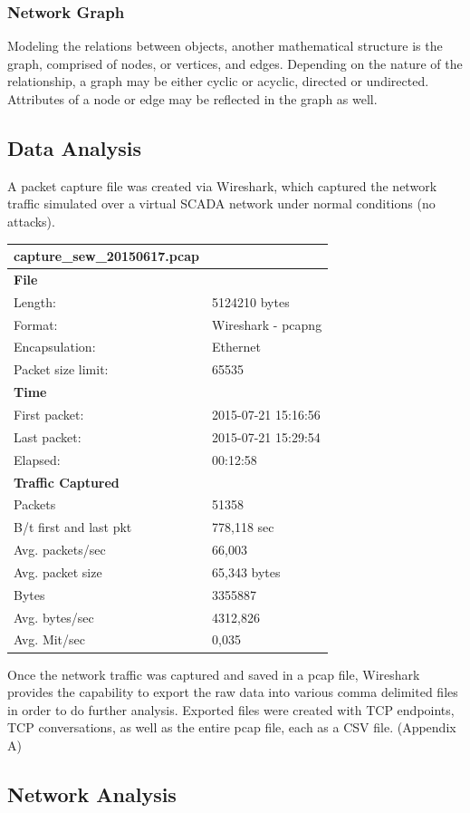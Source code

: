 \documentclass[12pt,]{article}
\begin{document}
\subsubsection{Network Graph}\label{network-graph}

Modeling the relations between objects, another mathematical structure
is the graph, comprised of nodes, or vertices, and edges. Depending on
the nature of the relationship, a graph may be either cyclic or acyclic,
directed or undirected. Attributes of a node or edge may be reflected in
the graph as well.

\subsection{Data Analysis}\label{data-analysis}

A packet capture file was created via Wireshark, which captured the
network traffic simulated over a virtual SCADA network under normal
conditions (no attacks).

\begin{longtable}[c]{@{}ll@{}}
\toprule
\textbf{capture\_sew\_20150617.pcap} &\tabularnewline
\midrule
\endhead
\textbf{File} &\tabularnewline
Length: & 5124210 bytes\tabularnewline
Format: & Wireshark - pcapng\tabularnewline
Encapsulation: & Ethernet\tabularnewline
Packet size limit: & 65535\tabularnewline
\textbf{Time} &\tabularnewline
First packet: & 2015-07-21 15:16:56\tabularnewline
Last packet: & 2015-07-21 15:29:54\tabularnewline
Elapsed: & 00:12:58\tabularnewline
\textbf{Traffic Captured} &\tabularnewline
Packets & 51358\tabularnewline
B/t first and last pkt & 778,118 sec\tabularnewline
Avg. packets/sec & 66,003\tabularnewline
Avg. packet size & 65,343 bytes\tabularnewline
Bytes & 3355887\tabularnewline
Avg. bytes/sec & 4312,826\tabularnewline
Avg. Mit/sec & 0,035\tabularnewline
\bottomrule
\end{longtable}

Once the network traffic was captured and saved in a pcap file,
Wireshark provides the capability to export the raw data into various
comma delimited files in order to do further analysis. Exported files
were created with TCP endpoints, TCP conversations, as well as the
entire pcap file, each as a CSV file. (Appendix A)

\clearpage

\subsection{Network Analysis}\label{network-analysis}
\end{document}
